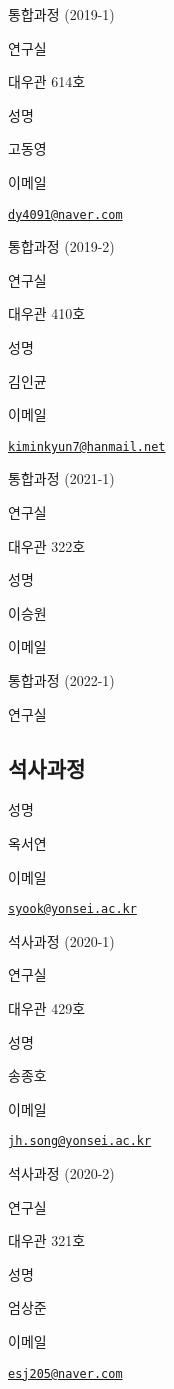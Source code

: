\documentclass[
]{book}
\begin{document}
통합과정 (2019-1)

연구실

대우관 614호

성명

고동영

이메일

\href{mailto:dy4091@naver.com}{\nolinkurl{dy4091@naver.com}}

통합과정 (2019-2)

연구실

대우관 410호

성명

김인균

이메일

\href{mailto:kiminkyun7@hanmail.net}{\nolinkurl{kiminkyun7@hanmail.net}}

통합과정 (2021-1)

연구실

대우관 322호

성명

이승원

이메일

통합과정 (2022-1)

연구실

\hypertarget{uxc11duxc0acuxacfcuxc815}{%
\subsection*{석사과정}\label{uxc11duxc0acuxacfcuxc815}}

성명

옥서연

이메일

\href{mailto:syook@yonsei.ac.kr}{\nolinkurl{syook@yonsei.ac.kr}}

석사과정 (2020-1)

연구실

대우관 429호

성명

송종호

이메일

\href{mailto:jh.song@yonsei.ac.kr}{\nolinkurl{jh.song@yonsei.ac.kr}}

석사과정 (2020-2)

연구실

대우관 321호

성명

엄상준

이메일

\href{mailto:esj205@naver.com}{\nolinkurl{esj205@naver.com}}
\end{document}
